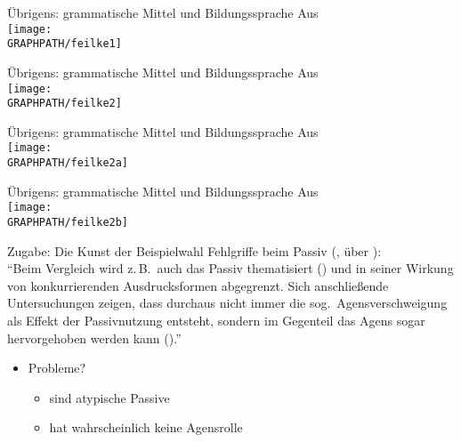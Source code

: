 \begin{frame}
  {Übrigens: grammatische Mittel und Bildungssprache}
  \pause
  Aus \citet{Feilke2012}\\
  \Halbzeile
  \pause
  \centering
  \texttt{[image: \\GRAPHPATH/feilke1]}
\end{frame}


\begin{frame}
  {Übrigens: grammatische Mittel und Bildungssprache}
  \pause
  Aus \citet{Feilke2012}\\
  \Halbzeile
  \pause
  \centering
  \texttt{[image: \\GRAPHPATH/feilke2]}
\end{frame}

\begin{frame}
  {Übrigens: grammatische Mittel und Bildungssprache}
  \pause
  Aus \citet{Feilke2012}\\
  \Halbzeile
  \pause
  \centering
  \texttt{[image: \\GRAPHPATH/feilke2a]}
\end{frame}

\begin{frame}
  {Übrigens: grammatische Mittel und Bildungssprache}
  \pause
  Aus \citet{Feilke2012}\\
  \Halbzeile
  \pause
  \centering
  \texttt{[image: \\GRAPHPATH/feilke2b]}
\end{frame}

\begin{frame}
  {Zugabe: Die Kunst der Beispielwahl}
  \pause
  Fehlgriffe beim \alert{Passiv} (\citealt{Gornik2003}, über \citealt{Klotz1995}):\\
  \Zeile
  \pause
  "`Beim Vergleich wird z.\,B.\ auch das Passiv thematisiert () und in seiner Wirkung von konkurrierenden Ausdrucksformen abgegrenzt.
  Sich anschließende Untersuchungen zeigen, dass durchaus nicht immer die sog.\ Agensverschweigung als Effekt der Passivnutzung entsteht, sondern im Gegenteil das Agens sogar hervorgehoben werden kann ()."'\\
  \Halbzeile
  \pause
  \begin{itemize}[<+->]
    \item Probleme?
    \begin{itemize}[<+->]
      \item {} sind atypische Passive
      \item {} hat wahrscheinlich keine Agensrolle
    \end{itemize}
  \end{itemize}
\end{frame}

